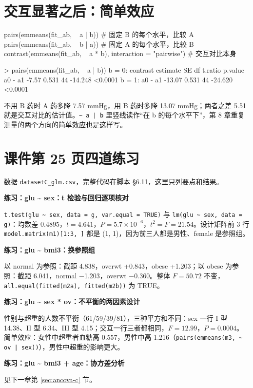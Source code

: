 \section{交互显著之后：简单效应}
\begin{rcode}
pairs(emmeans(fit_ab, ~ a | b))     # 固定 B 的每个水平，比较 A
pairs(emmeans(fit_ab, ~ b | a))     # 固定 A 的每个水平，比较 B
contrast(emmeans(fit_ab, ~ a * b), interaction = "pairwise")   # 交互对比本身
\end{rcode}
\begin{routput}
> pairs(emmeans(fit_ab, ~ a | b))
b = 0:
 contrast estimate    SE df t.ratio p.value
 a0 - a1     -7.57 0.531 44 -14.248 <0.0001
b = 1:
 a0 - a1    -13.07 0.531 44 -24.620 <0.0001
\end{routput}
不用 B 药时 A 药多降 7.57 mmHg，用 B 药时多降 13.07 mmHg；两者之差 5.51 就是交互对比的估计值。\Verb!~ a | b! 里竖线读作“在 b 的每个水平下”，第 8 章重复测量的两个方向的简单效应也是这样写。

\section{课件第 25 页四道练习}
数据 \Verb|datasetC_glm.csv|，完整代码在脚本 §6.11，这里只列要点和结果。


\begin{studyexplain}
\textbf{练习：glu \textasciitilde{} sex：t 检验与回归逐项核对}


\Verb|t.test(glu ~ sex, data = g, var.equal = TRUE)| 与 \Verb|lm(glu ~ sex, data = g)|：均数差 0.4895，$t=4.641$，$P=5.7\times10^{-6}$，$t^2=F=21.54$。设计矩阵前 3 行 \Verb|model.matrix(m1)[1:3, ]| 都是 (1, 1)，因为前三人都是男性、female 是参照组。

\end{studyexplain}



\begin{studyexplain}
\textbf{练习：glu \textasciitilde{} bmi3：换参照组}


以 normal 为参照：截距 4.838，overwt +0.843，obese +1.203；以 obese 为参照：截距 6.041，normal −1.203，overwt −0.360。整体 $F=50.72$ 不变，\Verb|all.equal(fitted(m2a), fitted(m2b))| 为 TRUE。

\end{studyexplain}



\begin{studyexplain}
\textbf{练习：glu \textasciitilde{} sex * ov：不平衡的两因素设计}


性别与超重的人数不平衡（61/59/39/81），三种平方和不同：sex 一行 I 型 14.38、II 型 6.34、III 型 4.15；交互一行三者都相同，$F=12.99$，$P=0.0004$。简单效应：女性中超重者血糖高 0.557，男性中高 1.216（\Verb!pairs(emmeans(m3, ~ ov | sex))!），男性中超重的影响更大。

\end{studyexplain}



\begin{studyexplain}
\textbf{练习：glu \textasciitilde{} bmi3 + age：协方差分析}


见下一章第 \ref{sec:ancova-c} 节。

\end{studyexplain}
